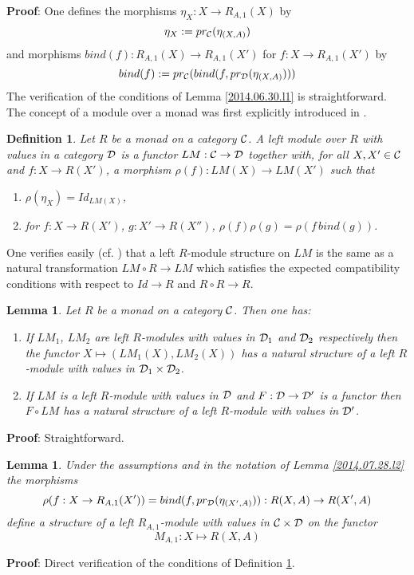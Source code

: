 \documentclass[11pt]{article}
\newenvironment{proof}{{\bf Proof}:}{\vskip 5mm }
\newtheorem{lemma}[proposition]{Lemma}
\newtheorem{definition}[proposition]{Definition}
\newcommand{\llabel}[1]{\label{#1}}
\newcommand{\sr}{\rightarrow}
\begin{document}
%
\begin{proof}
One defines the morphisms $\eta_X:X\sr R_{A,1}(X)$ by
%
$$\eta_X := pr_{\cal C}(\eta_{(X,A)})$$
%
and morphisms $ bind(f):R_{A,1}(X)\sr R_{A,1}(X')$ for $f:X\sr R_{A,1}(X')$ by
%
$$ bind(f) := pr_{\cal C}( bind(f,pr_{\cal D}(\eta_{(X,A)})))$$
%
The verification of the conditions of Lemma \ref{2014.06.30.l1} is straightforward. 
\end{proof}
% 
The concept of a module over a monad was first explicitly introduced in \cite{HM2007}.
%
\begin{definition}
\llabel{2014.07.26.d1} Let $R$ be a monad on a category ${\cal C}$. A left module over $R$ with values in a category $\cal D$ is a functor $LM:{\cal C}\sr {\cal D}$ together with, for all $X, X'\in {\cal C}$ and $f:X\sr R(X')$, a morphism $\rho(f):LM(X)\sr LM(X')$ such that
%
\begin{enumerate}
\item $\rho(\eta_X)=Id_{LM(X)}$,
\item for $f:X\sr R(X')$, $g:X'\sr R(X'')$, $\rho(f) \rho(g)=\rho(f\, bind(g))$.
\end{enumerate}
\end{definition}
%
One verifies easily (cf. \cite[Def. 9]{HM2010}) that a left $R$-module structure on $LM$ is the same as a natural transformation $LM\circ R\sr LM$ which satisfies the expected compatibility conditions with respect to $Id\sr R$ and $R\circ R\sr R$. 
%
\begin{lemma}
\llabel{2014.07.28.l1}
Let $R$ be a monad on a category $\cal C$. Then one has:
%
\begin{enumerate}
\item If $LM_1$, $LM_2$ are left $R$-modules with values in ${\cal D}_1$ and ${\cal D}_2$ respectively then the functor $X\mapsto (LM_1(X),LM_2(X))$ has a natural structure of a left $R$-module with values in ${\cal D}_1\times {\cal D}_2$.
\item If $LM$ is a left $R$-module with values in $\cal D$ and $F:{\cal D}\sr {\cal D'}$ is a functor then $F\circ LM$ has a natural structure of a left $R$-module with values in $\cal D'$.
\end{enumerate}
\end{lemma}
%
\begin{proof}
Straightforward.
\end{proof}
%
\begin{lemma}
\llabel{2014.07.28.l3}
Under the assumptions and in the notation of Lemma \ref{2014.07.28.l2} the morphisms
%
$$\rho(f:X\sr R_{A,1}(X'))= bind(f, pr_{\cal D}(\eta_{(X',A)})) : R(X,A)\sr R(X',A)$$
%
define a structure of a left $R_{A,1}$-module with values in ${\cal C}\times {\cal D}$ on the functor 
%
$$M_{A,1}:X\mapsto R(X,A)$$
%
\end{lemma}
%
\begin{proof}
Direct verification of the conditions of Definition \ref{2014.07.26.d1}.
\end{proof}
%
\end{document}

